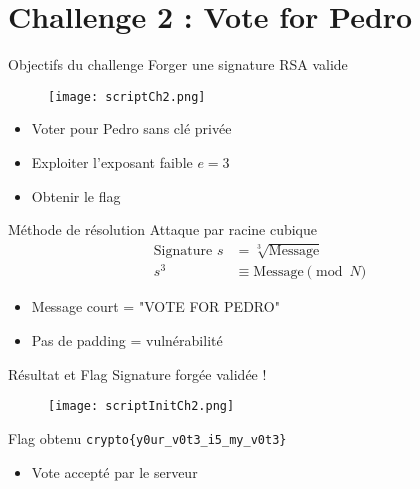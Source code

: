 
\section{Challenge 2 : Vote for Pedro}

\begin{frame}{Objectifs du challenge}
\centering
{\LARGE Forger une signature RSA valide}\\
\begin{figure}
    \centering
    \texttt{[image: scriptCh2.png]}
\end{figure}
\vspace{0.1cm}
\begin{itemize}
    \item Voter pour Pedro sans clé privée
    \item Exploiter l'exposant faible $e = 3$
    \item Obtenir le flag
\end{itemize}
\end{frame}

\begin{frame}{Méthode de résolution}
\centering
{\LARGE Attaque par racine cubique}
\vspace{0.5cm}
\begin{align*}
\text{Signature } s &= \sqrt[3]{\text{Message}} \\
s^3 &\equiv \text{Message} \pmod{N}
\end{align*}
\begin{itemize}
    \item Message court = "VOTE FOR PEDRO"
    \item Pas de padding = vulnérabilité
\end{itemize}
\end{frame}


\begin{frame}{Résultat et Flag}
\centering
{\LARGE Signature forgée validée !}
\begin{figure}
    \centering
    \texttt{[image: scriptInitCh2.png]}
\end{figure}
\vspace{0.1cm}
\begin{block}{Flag obtenu}
\texttt{crypto\{y0ur\_v0t3\_i5\_my\_v0t3\}}
\end{block}
\begin{itemize}
    \item Vote accepté par le serveur
\end{itemize}
\end{frame}